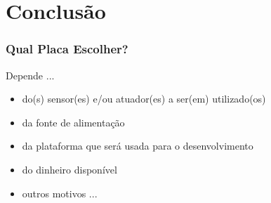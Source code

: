 \documentclass{beamer}
\begin{document}
%		

\section{Conclusão}

\begin{frame}
	\frametitle{Qual Placa Escolher?}
	\begin{minipage}{\textwidth}
		Depende ...
		\begin{itemize}
			\item do(s) sensor(es) e/ou atuador(es) a ser(em) utilizado(os)
			\item da fonte de alimentação
			\item da plataforma que será usada para o desenvolvimento
			\item do dinheiro disponível
			\item outros motivos ...
		\end{itemize}
	\end{minipage}
\end{frame} 
\end{document}
